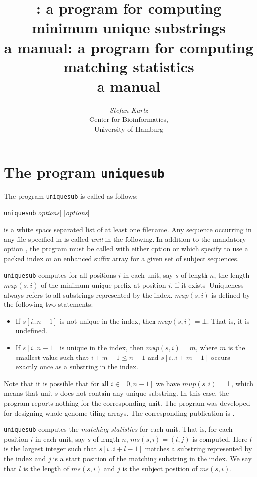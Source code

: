 \documentclass[12pt]{article}
\title{\Program: a program for computing\\
       minimum unique substrings\\
       a manual}
\title{\Program: a program for computing\\
       matching statistics\\
       a manual}
\author{\begin{tabular}{c}
         \textit{Stefan Kurtz}\\
         Center for Bioinformatics,\\
         University of Hamburg
        \end{tabular}}
\newcommand{\Substring}[3]{#1[#2..#3]}
\newcommand{\Program}[0]{\texttt{uniquesub}\xspace}
\newcommand{\Mup}[1]{\mathit{mup(s,#1)}}
\newcommand{\Program}[0]{\texttt{matstat}\xspace}
\newcommand{\MS}[1]{\mathit{ms(s,#1)}}
\begin{document}
\maketitle

\section{The program \Program}

The program \Program is called as follows:
\par
\noindent\Program [\textit{options}]   [\textit{options}] 
\par
{} is a white space separated list of at least one 
filename. Any sequence occurring in any file specified in 
is called \textit{unit} in the following.
In addition to the mandatory option , the program
must be called with either option  or 
which specify to use a packed index or an enhanced suffix array for 
a given set of subject sequences.

\begin{AboutUniquesub}
\Program computes for all positions \(i\) in each unit, say \(s\) of length
\(n\), the length \(\Mup{i}\) of the minimum unique prefix 
at position \(i\), if it exists. Uniqueness always refers to all substrings
represented by the index. \(\Mup{i}\) is defined by the following two 
statements:
\begin{itemize}
\item
If \(\Substring{s}{i}{n-1}\) is not unique in the index, then \(\Mup{i}=\bot\).
That is, it is undefined.
\item
If \(\Substring{s}{i}{n-1}\) is unique in the index, then \(\Mup{i}=m\), where 
\(m\) is the smallest value such that \(i+m-1\leq n-1\) and 
\(\Substring{s}{i}{i+m-1}\) occurs exactly once as a substring in the index.
\end{itemize}
Note that it is possible that for all \(i\in[0,n-1]\) we have 
\(\Mup{i}=\bot\), which means that unit \(s\) does not contain any unique 
substring. In this case, the program reports nothing for the corresponding
unit. The program was developed for designing whole genome tiling arrays.
The corresponding publication is \cite{GRAE:NIE:KUR:HUY:BIR:STU:FLI:2007}.
\end{AboutUniquesub}

\begin{AboutMatstat}
\Program computes the  \textit{matching statistics} for each unit. That is, 
for each position \(i\) in 
each unit, say \(s\) of length \(n\), \(\MS{i}=(l,j)\) is computed. Here
\(l\) is the largest integer such that \(\Substring{s}{i}{i+l-1}\) matches
a substring represented by the index and \(j\) is a start position of the
matching substring in the index. We say that \(l\) is the length of \(\MS{i}\)
and \(j\) is the subject position of \(\MS{i}\).
\end{AboutMatstat}
\end{document}
